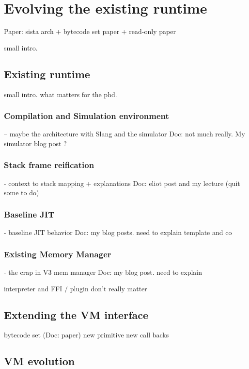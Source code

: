 \documentclass[a4paper,12pt,twoside]{../includes/ThesisStyle}
\begin{document}
\fi

\chapter{Evolving the existing runtime}
\label{chap:archImpl}
\minitoc

Paper: sista arch + bytecode set paper + read-only paper

small intro. 

\section{Existing runtime}

small intro. what matters for the phd. 

\subsection{Compilation and Simulation environment}
-- maybe the architecture with Slang and the simulator
Doc: not much really. My simulator blog post ?

\subsection{Stack frame reification}
- context to stack mapping + explanations
Doc: eliot post and my lecture (quit some to do)

\subsection{Baseline JIT}
- baseline JIT behavior
Doc: my blog posts. need to explain template and co

\subsection{Existing Memory Manager}
- the crap in V3 mem manager
Doc: my blog post. need to explain

interpreter and FFI / plugin don't really matter

\section{Extending the VM interface}

bytecode set (Doc: paper)
new primitive
new call backs

\section{VM evolution}
\end{document}

